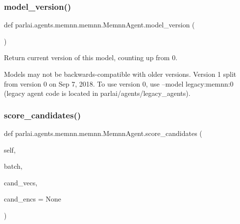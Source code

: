 \mbox{\label{classparlai_1_1agents_1_1memnn_1_1memnn_1_1MemnnAgent_ae6e06364ccf919d70064d5966e5c1cf3}} 
\subsubsection{\texorpdfstring{model\+\_\+version()}{model\_version()}}
{\footnotesize\ttfamily def parlai.\+agents.\+memnn.\+memnn.\+Memnn\+Agent.\+model\+\_\+version (\begin{DoxyParamCaption}{ }\end{DoxyParamCaption})\hspace{0.3cm}{\ttfamily [static]}}

\begin{DoxyVerb}Return current version of this model, counting up from 0.

Models may not be backwards-compatible with older versions. Version 1 split from
version 0 on Sep 7, 2018. To use version 0, use --model legacy:memnn:0 (legacy
agent code is located in parlai/agents/legacy_agents).
\end{DoxyVerb}
 \mbox{\label{classparlai_1_1agents_1_1memnn_1_1memnn_1_1MemnnAgent_a10b5418eda4da7bc85913e24e5b5a029}} 
\subsubsection{\texorpdfstring{score\+\_\+candidates()}{score\_candidates()}}
{\footnotesize\ttfamily def parlai.\+agents.\+memnn.\+memnn.\+Memnn\+Agent.\+score\+\_\+candidates (\begin{DoxyParamCaption}\item[{}]{self,  }\item[{}]{batch,  }\item[{}]{cand\+\_\+vecs,  }\item[{}]{cand\+\_\+encs = {\ttfamily None} }\end{DoxyParamCaption})}

